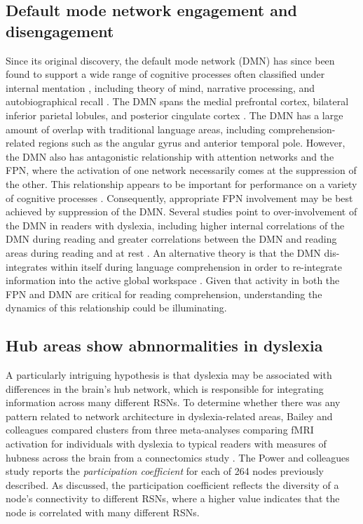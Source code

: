 \subsection{Default mode network engagement and disengagement} 
Since its original discovery, the default mode network (DMN) has since been found to support a wide range of cognitive processes often classified under internal mentation \citep{Buckner2008}, including theory of mind, narrative processing, and autobiographical recall \citep{AbdulSabur2014}. The DMN spans the medial prefrontal cortex, bilateral inferior parietal lobules, and posterior cingulate cortex \citep{Raichle2001}. The DMN has a large amount of overlap with traditional language areas, including comprehension-related regions such as the angular gyrus and anterior temporal pole. However, the DMN also has antagonistic relationship with attention networks and the FPN, where the activation of one network necessarily comes at the suppression of the other. This relationship appears to be important for performance on a variety of cognitive processes \citep{Fox2005, Keller2015}. Consequently, appropriate FPN involvement may be best achieved by suppression of the DMN. Several studies point to over-involvement of the DMN in readers with dyslexia, including higher internal correlations of the DMN during reading \citep{Finn2014} and greater correlations between the DMN and reading areas during reading and at rest \citep{Schurz2014}. An alternative theory is that the DMN dis-integrates within itself during language comprehension in order to re-integrate information into the active global workspace \citep{Spreng2013}. Given that activity in both the FPN and DMN are critical for reading comprehension, understanding the dynamics of this relationship could be illuminating.

\subsection{Hub areas show abnnormalities in dyslexia}
A particularly intriguing hypothesis is that dyslexia may be associated with differences in the brain's hub network, which is responsible for integrating information across many different RSNs. To determine whether there was any pattern related to network architecture in dyslexia-related areas, Bailey and colleagues compared clusters from three meta-analyses comparing fMRI activation for individuals with dyslexia to typical readers with measures of hubness across the brain from a connectomics study \citep{Maisog2008, Richlan2009, Paulesu2014, Power2013}. The Power and colleagues study reports the \textit{participation coefficient} for each of 264 nodes previously described. As discussed, the participation coefficient reflects the diversity of a node's connectivity to different RSNs, where a higher value indicates that the node is correlated with many different RSNs. 


